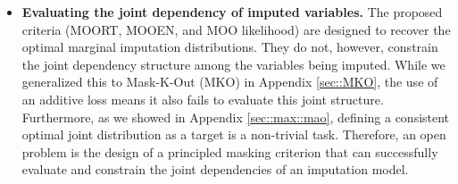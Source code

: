 \documentclass[aos, preprint]{imsart}
\theoremstyle{plain}
\theoremstyle{definition}
\begin{document}
\begin{itemize}

\item {\bf Evaluating the joint dependency of imputed variables.} The proposed criteria (MOORT, MOOEN, and MOO likelihood) are designed to recover the optimal marginal imputation distributions. They do not, however, constrain the joint dependency structure among the variables being imputed. While we generalized this to Mask-K-Out (MKO) in Appendix \ref{sec::MKO}, the use of an additive loss means it also fails to evaluate this joint structure. Furthermore, as we showed in Appendix \ref{sec::max::mao}, defining a consistent optimal joint distribution as a target is a non-trivial task. Therefore, an open problem is the design of a principled masking criterion that can successfully evaluate and constrain the joint dependencies of an imputation model.




\end{itemize}
\end{document}
